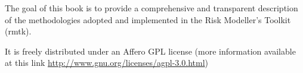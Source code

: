 The goal of this book is to provide a comprehensive and transparent description
of the methodologies adopted and implemented in the Risk Modeller's Toolkit
(rmtk).

It is freely distributed under an Affero GPL license 
(more information available at this link 
\href{http://www.gnu.org/licenses/agpl-3.0.html}{http://www.gnu.org/licenses/agpl-3.0.html})